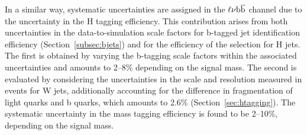 In a similar way, systematic uncertainties are assigned in the $\ell\nu{\mathrm{b}\overline{\mathrm{b}}}$ channel due to the uncertainty in the H tagging efficiency.
This contribution arises from both uncertainties in the data-to-simulation scale factors for b-tagged jet identification efficiency (Section~\ref{subsec:bjets})
and for the efficiency of the \mJ selection for H jets.
The first is obtained by varying the b-tagging scale factors within the associated uncertainties and amounts to 2--8\% depending on the signal mass.
The second is evaluated by considering the uncertainties in the \mJ scale and resolution measured in \ttbar events for W jets,
additionally accounting for the difference in fragmentation of light quarks and b quarks, which amounts to 2.6\% (Section~\ref{sec:htagging}).
The systematic uncertainty in the mass tagging efficiency is found to be 2--10\%, depending on the signal mass.

